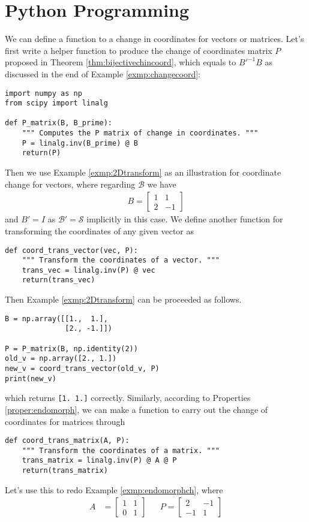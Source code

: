 \section{Python Programming}
We can define a function to a change in coordinates for vectors or matrices. Let's first write a helper function to produce the change of coordinates matrix $P$ proposed in Theorem \ref{thm:bijectivechincoord}, which equals to $B'^{-1}B$ as discussed in the end of Example \ref{exmp:changecoord}:
\begin{lstlisting}
import numpy as np
from scipy import linalg

def P_matrix(B, B_prime):
    """ Computes the P matrix of change in coordinates. """
    P = linalg.inv(B_prime) @ B
    return(P)
\end{lstlisting}
Then we use Example \ref{exmp:2Dtransform} as an illustration for coordinate change for vectors, where regarding $\mathcal{B}$ we have
\begin{align*}
B = 
\begin{bmatrix}
1 & 1 \\ 
2 & -1
\end{bmatrix}
\end{align*}
and $B' = I$ as $\mathcal{B}' = \mathcal{S}$ implicitly in this case. We define another function for transforming the coordinates of any given vector as
\begin{lstlisting}
def coord_trans_vector(vec, P):
    """ Transform the coordinates of a vector. """
    trans_vec = linalg.inv(P) @ vec
    return(trans_vec)    
\end{lstlisting}
Then Example \ref{exmp:2Dtransform} can be proceeded as follows.
\begin{lstlisting}
B = np.array([[1.,  1.], 
              [2., -1.]])

P = P_matrix(B, np.identity(2))
old_v = np.array([2., 1.])
new_v = coord_trans_vector(old_v, P)
print(new_v)    
\end{lstlisting}
which returns \verb|[1. 1.]| correctly. Similarly, according to Properties \ref{proper:endomorph}, we can make a function to carry out the change of coordinates for matrices through
\begin{lstlisting}
def coord_trans_matrix(A, P):
    """ Transform the coordinates of a matrix. """
    trans_matrix = linalg.inv(P) @ A @ P
    return(trans_matrix)    
\end{lstlisting}
Let's use this to redo Example \ref{exmp:endomorphch}, where
\begin{align*}
A &= 
\begin{bmatrix}
1 & 1 \\
0 & 1
\end{bmatrix} &
& P=
\begin{bmatrix}
2 & -1 \\
-1 & 1
\end{bmatrix}
\end{align*}

